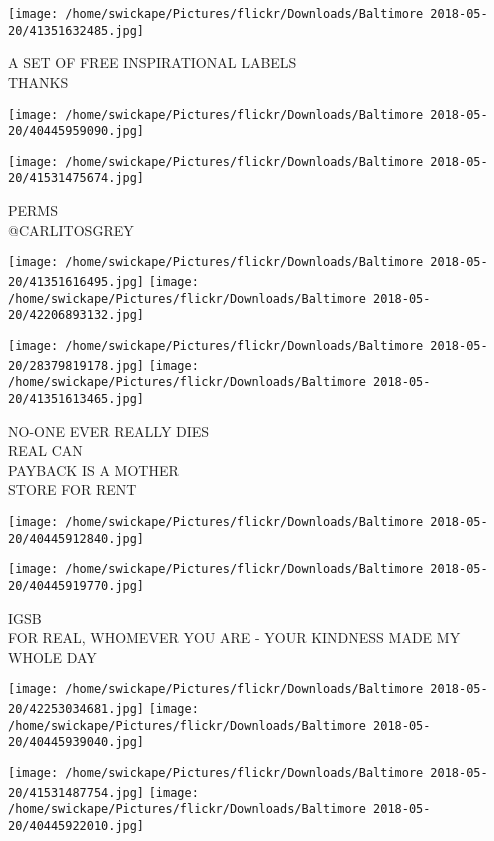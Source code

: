 \documentclass[10pt,letterpaper]{article}
\begin{document}
\vspace{0.25in}
\texttt{[image: /home/swickape/Pictures/flickr/Downloads/Baltimore 2018-05-20/41351632485.jpg]}

A SET OF FREE INSPIRATIONAL LABELS\\
THANKS\\
\pagebreak

\texttt{[image: /home/swickape/Pictures/flickr/Downloads/Baltimore 2018-05-20/40445959090.jpg]}

\vspace{0.25in}
\texttt{[image: /home/swickape/Pictures/flickr/Downloads/Baltimore 2018-05-20/41531475674.jpg]}

PERMS\\
@CARLITOSGREY\\
\pagebreak

\texttt{[image: /home/swickape/Pictures/flickr/Downloads/Baltimore 2018-05-20/41351616495.jpg]}
\texttt{[image: /home/swickape/Pictures/flickr/Downloads/Baltimore 2018-05-20/42206893132.jpg]}

\texttt{[image: /home/swickape/Pictures/flickr/Downloads/Baltimore 2018-05-20/28379819178.jpg]}
\texttt{[image: /home/swickape/Pictures/flickr/Downloads/Baltimore 2018-05-20/41351613465.jpg]}

NO{-}ONE EVER REALLY DIES\\
REAL CAN\\
PAYBACK IS A MOTHER\\
STORE FOR RENT\\
\pagebreak

\texttt{[image: /home/swickape/Pictures/flickr/Downloads/Baltimore 2018-05-20/40445912840.jpg]}

\vspace{0.25in}
\texttt{[image: /home/swickape/Pictures/flickr/Downloads/Baltimore 2018-05-20/40445919770.jpg]}

IGSB\\
FOR REAL, WHOMEVER YOU ARE {-} YOUR KINDNESS MADE MY WHOLE DAY\\
\pagebreak

\texttt{[image: /home/swickape/Pictures/flickr/Downloads/Baltimore 2018-05-20/42253034681.jpg]}
\texttt{[image: /home/swickape/Pictures/flickr/Downloads/Baltimore 2018-05-20/40445939040.jpg]}

\texttt{[image: /home/swickape/Pictures/flickr/Downloads/Baltimore 2018-05-20/41531487754.jpg]}
\texttt{[image: /home/swickape/Pictures/flickr/Downloads/Baltimore 2018-05-20/40445922010.jpg]}
\end{document}
